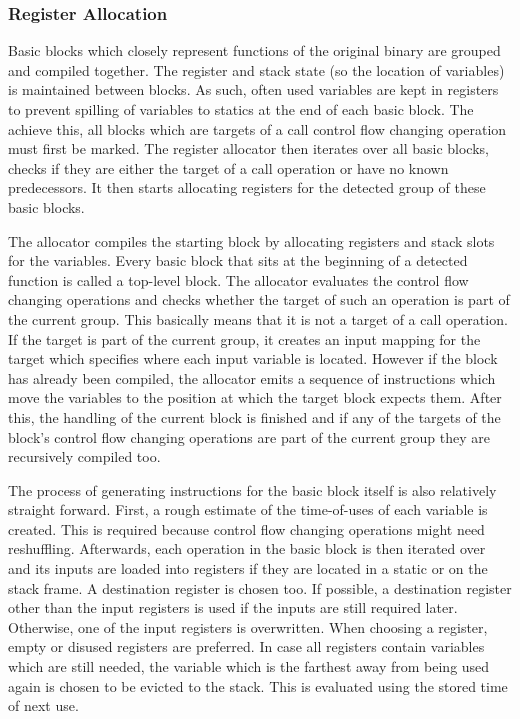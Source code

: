 \documentclass[course=eragp]{aspdoc}
\begin{document}
\subsubsection{Register Allocation}\label{reg_alloc}
Basic blocks which closely represent functions of the original binary are grouped and compiled
together. The register and stack state (so the location of variables) is maintained between blocks.
As such, often used variables are kept in registers to prevent spilling of variables to statics at the end of each basic block.
The achieve this, all blocks which are targets of a call control flow changing operation must first
be marked. The register allocator then iterates over
all basic blocks, checks if they are either the target of a call operation or have no known predecessors.
It then starts allocating registers for the detected group of these basic blocks.
\par

The allocator compiles the starting block by allocating registers and stack slots for the
variables. Every basic block that sits at the beginning of a detected function is called a top-level
block. The allocator evaluates the control flow changing operations and checks whether the target of such an operation
is part of the current group.
This basically means that it is not a target of a call operation. If the target is part of the
current group, it creates an input mapping for the target which specifies where each input variable
is located. However if the block has already been compiled,
the allocator emits a sequence of instructions which move the variables to the position at which the target block expects them.
After this, the handling of the current block is finished and if any of the targets of the block's
control flow changing operations are part of the current group they are recursively compiled too.

\par

The process of generating instructions for the basic block itself is also relatively straight forward. First,
a rough estimate of the time-of-uses of
each variable is created. This is required because control flow changing operations might need
reshuffling.
Afterwards, each operation in the basic block is then iterated over and its inputs are loaded into
registers if they are located in a static or on the stack frame. A destination register is
chosen too.
If possible, a destination register other than the input registers is used if the inputs
are still required later. Otherwise, one of the input registers is overwritten.
When choosing a register, empty or disused registers are preferred. In case all registers contain variables which
are still needed,
the variable which is the farthest away from being used again is chosen to be evicted to the stack.
This is evaluated using the stored time of next use.
\end{document}
